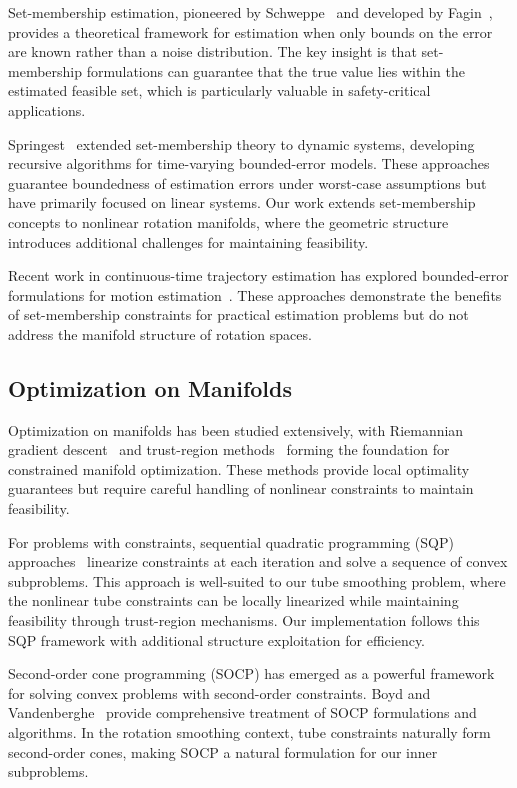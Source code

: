 Set-membership estimation, pioneered by Schweppe~\cite{schweppe} and developed by Fagin~\cite{fagin}, provides a theoretical framework for estimation when only bounds on the error are known rather than a noise distribution. The key insight is that set-membership formulations can guarantee that the true value lies within the estimated feasible set, which is particularly valuable in safety-critical applications.

Springest~\cite{springest} extended set-membership theory to dynamic systems, developing recursive algorithms for time-varying bounded-error models. These approaches guarantee boundedness of estimation errors under worst-case assumptions but have primarily focused on linear systems. Our work extends set-membership concepts to nonlinear rotation manifolds, where the geometric structure introduces additional challenges for maintaining feasibility.

Recent work in continuous-time trajectory estimation has explored bounded-error formulations for motion estimation~\cite{continuous_time_trajectory}. These approaches demonstrate the benefits of set-membership constraints for practical estimation problems but do not address the manifold structure of rotation spaces.

\subsection{Optimization on Manifolds}

Optimization on manifolds has been studied extensively, with Riemannian gradient descent~\cite{absil} and trust-region methods~\cite{conn} forming the foundation for constrained manifold optimization. These methods provide local optimality guarantees but require careful handling of nonlinear constraints to maintain feasibility.

For problems with constraints, sequential quadratic programming (SQP) approaches~\cite{sqp} linearize constraints at each iteration and solve a sequence of convex subproblems. This approach is well-suited to our tube smoothing problem, where the nonlinear tube constraints can be locally linearized while maintaining feasibility through trust-region mechanisms. Our implementation follows this SQP framework with additional structure exploitation for efficiency.

Second-order cone programming (SOCP) has emerged as a powerful framework for solving convex problems with second-order constraints. Boyd and Vandenberghe~\cite{boyd_scp} provide comprehensive treatment of SOCP formulations and algorithms. In the rotation smoothing context, tube constraints naturally form second-order cones, making SOCP a natural formulation for our inner subproblems.

